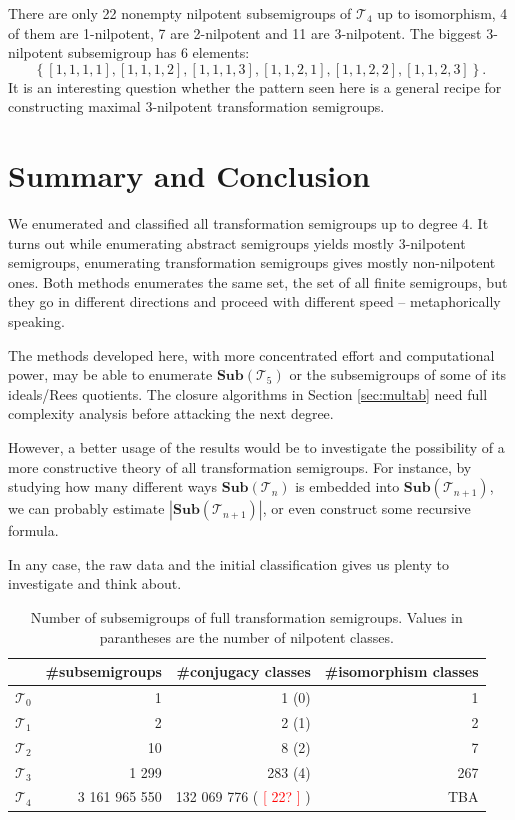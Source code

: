\documentclass{amsart}
\newcommand{\cT}{{\mathcal T}}
\newcommand{\Sub}{\mathbf{Sub}}
\newcommand{\todo}[1]{\textcolor{red}{ \small \textsf{[ #1 ]} \normalsize}}
\theoremstyle{plain}
\theoremstyle{definition}
\begin{document}
There are only 22 nonempty nilpotent subsemigroups of $\cT_4$ up to isomorphism, 4 of them are 1-nilpotent, 7 are 2-nilpotent and 11 are 3-nilpotent.
The biggest 3-nilpotent subsemigroup has 6 elements:
$$\left\{[1,1,1,1],[1,1,1,2],[1,1,1,3],[1,1,2,1],[1,1,2,2],[1,1,2,3]\right\}.$$
It is an interesting question whether the pattern seen here is a general recipe for constructing maximal 3-nilpotent transformation semigroups.
\section{Summary and Conclusion}
We enumerated and classified all transformation semigroups up to degree 4.
It turns out while enumerating abstract semigroups yields mostly 3-nilpotent semigroups, enumerating transformation semigroups gives mostly non-nilpotent ones.
Both methods enumerates the same set, the set of all finite semigroups, but they go in different directions and proceed with different speed -- metaphorically speaking. 

The methods developed here, with more concentrated effort and computational power,  may be able to enumerate $\Sub(\cT_5)$ or the subsemigroups of some of its ideals/Rees quotients. 
The closure algorithms in Section \ref{sec:multab} need full complexity analysis before attacking the next degree. 

However, a better usage of the results would be to investigate the possibility of a more constructive theory of all transformation semigroups.
For instance, by studying how many different ways $\Sub(\cT_n)$ is embedded into $\Sub(\cT_{n+1})$, we can probably estimate $|\Sub(\cT_{n+1})|$, or even construct some recursive formula.

In any case, the raw data and the initial classification gives us plenty to investigate and think about.
\begin{table}
\renewcommand{\arraystretch}{1}
\begin{tabular}{|c|r|r|r|}
\hline
 & \#subsemigroups & \#conjugacy classes & \#isomorphism classes \\
\hline
$\cT_0$ & 1  & 1 (0)& 1\\
\hline
$\cT_1$ & 2  & 2 (1)& 2\\
\hline
$\cT_2$ & 10  & 8 (2)& 7\\
\hline
$\cT_3$ & 1 299 & 283 (4)& 267\\
\hline
$\cT_4$ & 3 161 965 550 & 132 069 776 (\todo{22?})& TBA\\
\hline
\end{tabular}
\caption{Number of subsemigroups of full transformation semigroups. Values in parantheses are the number of nilpotent classes.}
\end{table}
\end{document}

